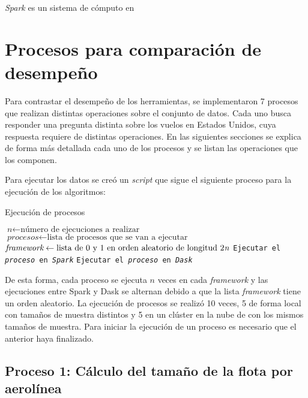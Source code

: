 \textit{Spark} es un sistema de cómputo en 

\section{Procesos para comparación de desempeño}

Para contrastar el desempeño de los herramientas, se implementaron 7 procesos que realizan distintas operaciones sobre el conjunto de datos. Cada uno busca responder una pregunta distinta sobre los vuelos en Estados Unidos, cuya respuesta requiere de distintas operaciones. En las siguientes secciones se explica de forma más detallada cada uno de los procesos y se listan las operaciones que los componen.

Para ejecutar los datos se creó un \textit{script} que sigue el siguiente proceso para la ejecución de los algoritmos:

\begin{algorithm}[H]
\caption{Ejecución de procesos}\label{ejecucion_procesos}
\begin{algorithmic}[1]
\State $\textit{n} \gets \text{número de ejecuciones a realizar}$
\State $\textit{procesos} \gets \text{lista de procesos que se van a ejecutar}$
	\State $\textit{framework} \gets \text{lista de 0 y 1 en orden aleatorio de longitud 2\textit{n}}$
		\State \texttt{Ejecutar el \textit{proceso} en \textit{Spark}}
		\Else
		\State \texttt{Ejecutar el \textit{proceso} en \textit{Dask}}
		\EndIf
	\EndFor
\EndFor
\EndProcedure
\end{algorithmic}
\end{algorithm}

De esta forma, cada proceso se ejecuta $n$ veces en cada \textit{framework} y las ejecuciones entre Spark y Dask se alternan debido a que la lista \textit{framework} tiene un orden aleatorio. La ejecución de procesos se realizó 10 veces, 5 de forma local con tamaños de muestra distintos y 5 en un clúster en la nube de con los mismos tamaños de muestra. Para iniciar la ejecución de un proceso es necesario que el anterior haya finalizado.

\subsection{Proceso 1: Cálculo del tamaño de la flota por aerolínea}

